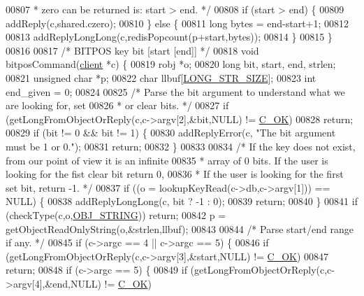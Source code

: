 \begin{DoxyCode}
{00807 \textcolor{comment}{     * zero can be returned is: start > end. */}
00808     \textcolor{keywordflow}{if} (start > end) \{
00809         addReply(c,shared.czero);
00810     \} \textcolor{keywordflow}{else} \{
00811         \textcolor{keywordtype}{long} bytes = end-start+1;
00812 
00813         addReplyLongLong(c,redisPopcount(p+start,bytes));
00814     \}
00815 \}
00816 
00817 \textcolor{comment}{/* BITPOS key bit [start [end]] */}
00818 \textcolor{keywordtype}{void} bitposCommand(\hyperlink{structclient}{client} *c) \{
00819     robj *o;
00820     \textcolor{keywordtype}{long} bit, start, end, strlen;
00821     \textcolor{keywordtype}{unsigned} \textcolor{keywordtype}{char} *p;
00822     \textcolor{keywordtype}{char} llbuf[\hyperlink{server_8h_a39ec35278876f65fc1ef70b049856ca3}{LONG\_STR\_SIZE}];
00823     \textcolor{keywordtype}{int} end\_given = 0;
00824 
00825     \textcolor{comment}{/* Parse the bit argument to understand what we are looking for, set}
00826 \textcolor{comment}{     * or clear bits. */}
00827     \textcolor{keywordflow}{if} (getLongFromObjectOrReply(c,c->argv[2],&bit,NULL) != \hyperlink{server_8h_a303769ef1065076e68731584e758d3e1}{C\_OK})
00828         \textcolor{keywordflow}{return};
00829     \textcolor{keywordflow}{if} (bit != 0 && bit != 1) \{
00830         addReplyError(c, \textcolor{stringliteral}{"The bit argument must be 1 or 0."});
00831         \textcolor{keywordflow}{return};
00832     \}
00833 
00834     \textcolor{comment}{/* If the key does not exist, from our point of view it is an infinite}
00835 \textcolor{comment}{     * array of 0 bits. If the user is looking for the fist clear bit return 0,}
00836 \textcolor{comment}{     * If the user is looking for the first set bit, return -1. */}
00837     \textcolor{keywordflow}{if} ((o = lookupKeyRead(c->db,c->argv[1])) == NULL) \{
00838         addReplyLongLong(c, bit ? -1 : 0);
00839         \textcolor{keywordflow}{return};
00840     \}
00841     \textcolor{keywordflow}{if} (checkType(c,o,\hyperlink{server_8h_a65236ea160f69cdef33ec942092af88f}{OBJ\_STRING})) \textcolor{keywordflow}{return};
00842     p = getObjectReadOnlyString(o,&strlen,llbuf);
00843 
00844     \textcolor{comment}{/* Parse start/end range if any. */}
00845     \textcolor{keywordflow}{if} (c->argc == 4 || c->argc == 5) \{
00846         \textcolor{keywordflow}{if} (getLongFromObjectOrReply(c,c->argv[3],&start,NULL) != \hyperlink{server_8h_a303769ef1065076e68731584e758d3e1}{C\_OK})
00847             \textcolor{keywordflow}{return};
00848         \textcolor{keywordflow}{if} (c->argc == 5) \{
00849             \textcolor{keywordflow}{if} (getLongFromObjectOrReply(c,c->argv[4],&end,NULL) != \hyperlink{server_8h_a303769ef1065076e68731584e758d3e1}{C\_OK})
}
\end{DoxyCode}
